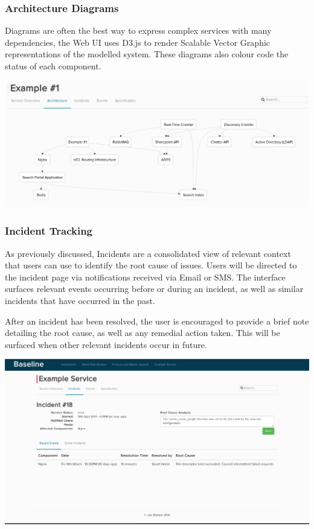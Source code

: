 \documentclass{cshonours}
\begin{document}
\subsubsection{Architecture Diagrams}

Diagrams are often the best way to express complex services with many dependencies, the Web UI uses D3.js to render Scalable Vector Graphic representations of the modelled system. These diagrams also colour code the status of each component.

\begin{center}
  \includegraphics[scale=0.33]{web-ui/architecture.png}
\end{center}

\subsubsection{Incident Tracking}

As previously discussed, Incidents are a consolidated view of relevant context that users can use to identify the root cause of issues. Users will be directed to the incident page via notifications received via Email or SMS\@. The interface surfaces relevant events occurring before or during an incident, as well as similar incidents that have occurred in the past.

After an incident has been resolved, the user is encouraged to provide a brief note detailing the root cause, as well as any remedial action taken. This will be surfaced when other relevant incidents occur in future.

\begin{center}
  \includegraphics[scale=0.28]{web-ui/incidents.png}
\end{center}
\end{document}
